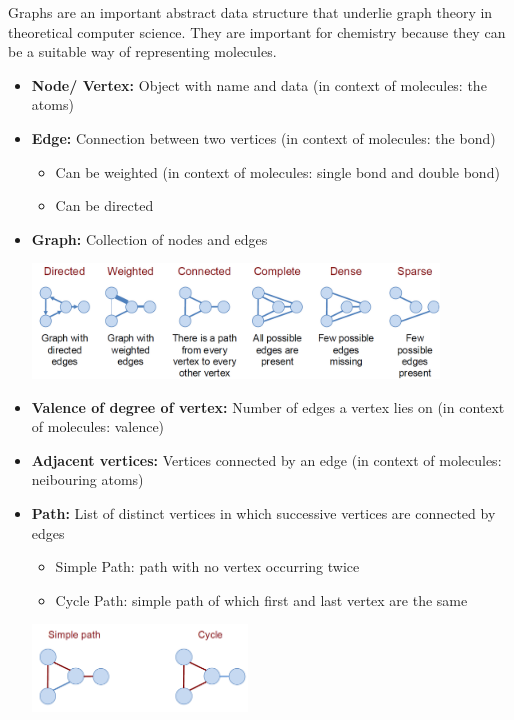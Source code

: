 
Graphs are an important abstract data structure that underlie graph theory in theoretical computer science. They are important for chemistry because they can be a suitable way of representing molecules.

\begin{itemize}
    \item \textbf{Node/ Vertex:} Object with name and data (in context of molecules: the atoms)
    \item \textbf{Edge:} Connection between two vertices (in context of molecules: the bond)
    \begin{itemize}
        \item Can be weighted (in context of molecules: single bond and double bond)
        \item Can be directed 
    \end{itemize}
    \item \textbf{Graph:} Collection of nodes and edges
    \begin{center}\includegraphics[width=0.85\textwidth]{img/graphs/DifferentGraphs.png}\end{center}
    \item \textbf{Valence of degree of vertex:} Number of edges a vertex lies on (in context of molecules: valence)
    \item \textbf{Adjacent vertices:} Vertices connected by an edge (in context of molecules: neibouring atoms)
    \item \textbf{Path:} List of distinct vertices in which successive vertices are connected by edges
    \begin{itemize}
        \item Simple Path: path with no vertex occurring twice
        \item Cycle Path: simple path of which first and last vertex are the same
    \end{itemize}
    \begin{center}\includegraphics[width=0.45\textwidth]{img/graphs/PathGraphs.png}\end{center}

\end{itemize}
